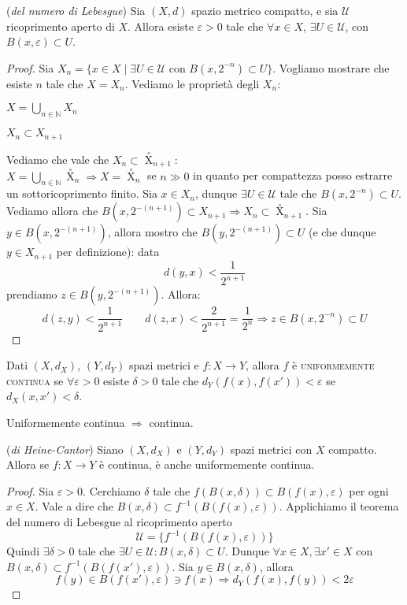 \begin{thm}(\emph{del numero di Lebesgue}) Sia $(X,d)$ spazio metrico compatto, e sia $\mathcal{U}$ ricoprimento aperto di $X$. Allora esiste $\varepsilon >0$ tale che $\forall x \in X$, $\exists U \in \mathcal{U}$, con $B(x, \varepsilon) \subset U$.
\end{thm}
\begin{proof}
Sia $X_n=\{ x \in X \mid \exists U \in \mathcal{U} \text{ con } B(x, 2^{-n}) \subset U \}$. Vogliamo mostrare che esiste $n$ tale che $X=X_n$. Vediamo le proprietà degli $X_n$:
\begin{nlist}
\item $\displaystyle X=\bigcup _{n \in \mathbb{N}} X_n$
\item $X_n \subset X_{n+1}$
\end{nlist}
Vediamo che vale che $X_n \subset {\mathop X\limits^ \circ} _{n+1}$:\\
$\displaystyle X=\bigcup _{n \in \mathbb{N}} {\mathop X\limits^ \circ}_n \Longrightarrow X={\mathop X\limits^ \circ}_n$ se $n \gg 0$ in quanto per compattezza posso estrarre un sottoricoprimento finito. Sia $x \in X_n$, dunque $\exists U \in \mathcal{U}$ tale che $B(x, 2^{-n}) \subset U$. Vediamo allora che $B(x, 2^{-(n+1)}) \subset X_{n+1} \Longrightarrow X_n \subset {\mathop X\limits^ \circ}_{n+1}$. Sia $y \in B(x, 2^{-(n+1)})$, allora mostro che $B(y, 2^{-(n+1)}) \subset U$ (e che dunque $y \in X_{n+1}$ per definizione): data
$$d(y,x)< \dfrac{1}{2^{n+1}}$$
prendiamo $z \in B(y,2^{-(n+1)})$. Allora:
$$d(z,y)<\dfrac{1}{2^{n+1}} \qquad d(z,x)<\dfrac{2}{2^{n+1}}=\dfrac{1}{2^n} \Longrightarrow z \in B(x,2^{-n}) \subset U$$
\end{proof}

\begin{defn}
Dati $(X,d_X)$, $(Y,d_Y)$ spazi metrici e $f:X \longrightarrow Y$, allora $f$ è \textsc{uniformemente continua} se $\forall \varepsilon >0$ esiste $\delta >0$ tale che $d_Y(f(x),f(x'))<\varepsilon$ se $d_X(x,x')<\delta$.
\end{defn}

\begin{oss}
Uniformemente continua $\Longrightarrow$ continua.
\end{oss}

\begin{thm}(\emph{di Heine-Cantor})
Siano $(X,d_X)$ e $(Y,d_Y)$ spazi metrici con $X$ compatto. Allora se $f:X \longrightarrow Y$ è continua, è anche uniformemente continua.
\end{thm}
\begin{proof}
Sia $\varepsilon>0$. Cerchiamo $\delta$ tale che $f(B(x,\delta)) \subset B(f(x), \varepsilon)$ per ogni $x \in X$. Vale a dire che $B(x,\delta) \subset f^{-1}(B(f(x),\varepsilon))$. Applichiamo il teorema del numero di Lebesgue al ricoprimento aperto
$$\mathcal{U}=\{f^{-1}(B(f(x),\varepsilon))\}$$
Quindi $\exists \delta >0$ tale che $\exists U \in \mathcal{U}: B(x,\delta) \subset U$. Dunque $\forall x \in X, \exists x' \in X$ con $B(x,\delta) \subset f^{-1}(B(f(x'),\varepsilon))$. Sia $y \in B(x, \delta)$, allora 
$$f(y) \in B(f(x'),\varepsilon) \ni f(x) \Longrightarrow d_Y(f(x),f(y))<2\varepsilon$$
\end{proof}

